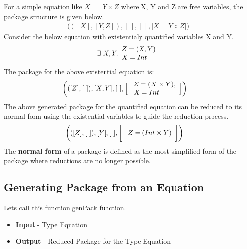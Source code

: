 \documentclass[11pt]{article}
\begin{document}
~~\\~~\\ 
For a simple equation like $X ~ = ~ Y \times Z$ where X, Y and Z are free variables, the package structure is given below.
\begin {align*}
 \bigg(([X],[Y,Z]),[~],[~],\Big[X = Y \times Z \Big]\bigg)
\end {align*}
Consider the below equation with existentialy quantified variables X and Y.
\begin{align*}
\exists ~ X,Y .
  \begin{array}[c]{l}
   Z = (X,Y) \\ 
   X = Int
  \end {array} 
\end {align*}
The package for the above existential equation is:
\begin{align*}
    \bigg(([Z],[~]),[X,Y],[~],\Big[
                              \begin{array}[c]{l}
                               ~Z = (X \times Y),\\ 
                               ~X = Int~   
                              \end{array}
                          & \Big]\bigg )
\end{align*}
The above generated package for the quantified equation can be reduced to its normal form using the existential variables to guide the reduction process.
\begin{align*}
    \bigg(([Z],[~]),[Y],[~],\bigg[
                              \begin{array}[c]{l}
                               ~Z = (Int \times Y) 
                              \end{array}
                          & \bigg]\bigg )
\end{align*}
The {\bf normal form} of a package is defined as the most simplified form of the package where reductions are no longer possible. 
\subsection {Generating Package from an Equation}\label{GenPack}
Lets call this function genPack function. 
\begin{itemize}
    \item {\bf Input}  - Type Equation 
    \item {\bf Output} - Reduced Package for the Type Equation 
\end{itemize}
\end{document}
